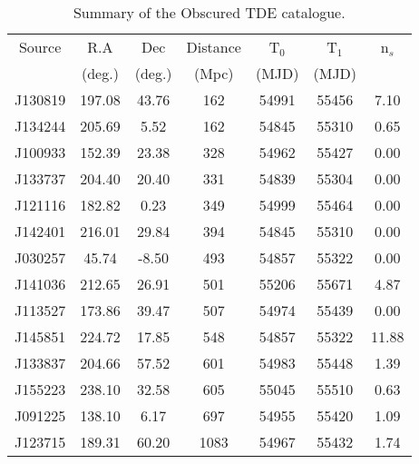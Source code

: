 \begin{table*}[]
	\centering
	\begin{tabular}{|c | c c c | c c | c |} 
		\hline
		Source & R.A & Dec & Distance & T$_{0}$ & T$_{1}$ & n$_{s}$ \\
		& (deg.) & (deg.) & (Mpc) & (MJD) & (MJD) & \\
		\hline
		J130819 & 197.08 & 43.76 & 162 & 54991 & 55456  & 7.10 \\
		J134244 & 205.69 & 5.52 & 162 & 54845 & 55310  & 0.65 \\
		J100933 & 152.39 & 23.38 & 328 & 54962 & 55427  & 0.00 \\
		J133737 & 204.40 & 20.40 & 331 & 54839 & 55304  & 0.00 \\
		J121116 & 182.82 & 0.23 & 349 & 54999 & 55464  & 0.00 \\
		J142401 & 216.01 & 29.84 & 394 & 54845 & 55310  & 0.00 \\
		J030257 & 45.74 & -8.50 & 493 & 54857 & 55322  & 0.00 \\
		J141036 & 212.65 & 26.91 & 501 & 55206 & 55671  & 4.87 \\
		J113527 & 173.86 & 39.47 & 507 & 54974 & 55439  & 0.00 \\
		J145851 & 224.72 & 17.85 & 548 & 54857 & 55322  & 11.88 \\
		J133837 & 204.66 & 57.52 & 601 & 54983 & 55448  & 1.39 \\
		J155223 & 238.10 & 32.58 & 605 & 55045 & 55510  & 0.63 \\
		J091225 & 138.10 & 6.17 & 697 & 54955 & 55420  & 1.09 \\
		J123715 & 189.31 & 60.20 & 1083 & 54967 & 55432  & 1.74 \\
		\hline
	\end{tabular}
	\caption{Summary of the Obscured TDE catalogue.}
	\label{tab:obscured_cat}
\end{table*}{}
